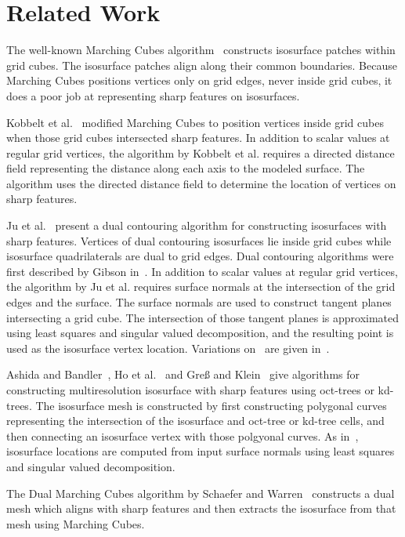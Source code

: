 

\section{Related Work}
\label{section:related}

The well-known Marching Cubes algorithm~\cite{lc-mchr3-87}
constructs isosurface patches within grid cubes.
The isosurface patches align along their common boundaries.
Because Marching Cubes positions vertices only on grid edges,
never inside grid cubes,
it does a poor job at representing sharp features on isosurfaces.

Kobbelt et al.~\cite{kbsh-fssev-01} modified Marching Cubes 
to position vertices inside grid cubes when those grid cubes
intersected sharp features.
In addition to scalar values at regular grid vertices,
the algorithm by Kobbelt et al. requires a directed distance field
representing the distance along each axis to the modeled surface.
The algorithm uses the directed distance field to determine
the location of vertices on sharp features.

Ju et al.~\cite{jlsw-dchd-02,sw-dcss-02} present a dual contouring algorithm
for constructing isosurfaces with sharp features.
Vertices of dual contouring isosurfaces lie inside grid cubes
while isosurface quadrilaterals are dual to grid edges.
Dual contouring algorithms were first described
by Gibson in~\cite{gh-ssqem-97,g-cesng-98}.
In addition to scalar values at regular grid vertices,
the algorithm by Ju et al. requires surface normals
at the intersection of the grid edges and the surface.
The surface normals are used to construct tangent planes
intersecting a grid cube.
The intersection of those tangent planes is approximated 
using least squares and singular valued decomposition,
and the resulting point is used as the isosurface vertex location.
Variations on~\cite{jlsw-dchd-02} are given 
in~\cite{zhk-dctps-04,Varadhan:2003:fss}.

Ashida and Bandler~\cite{ab-fpmmo-03}, Ho et al.~\cite{hwco-cmsaf-05}
and Gre{\ss} and Klein~\cite{gk-eretm-04} give algorithms
for constructing multiresolution isosurface with sharp features
using oct-trees or kd-trees.
The isosurface mesh is constructed
by first constructing polygonal curves representing the intersection
of the isosurface and oct-tree or kd-tree cells,
and then connecting an isosurface vertex with those polgyonal curves.
As in~\cite{jlsw-dchd-02},
isosurface locations are computed from input surface normals
using least squares and singular valued decomposition.

The Dual Marching Cubes algorithm by Schaefer and Warren~\cite{sw-dmcpc-04}
constructs a dual mesh which aligns with sharp features
and then extracts the isosurface from that mesh using Marching Cubes.

